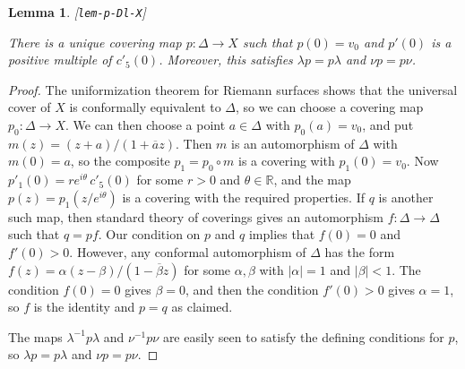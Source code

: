 \documentclass[reqno]{amsart}
\newcommand{\lbl}[1]{\label{#1}\textup{[\texttt{#1}]}\par}
\newcommand{\lbl}{\label}
\newcommand{\Dl}        {\Delta}
\newcommand{\al}        {\alpha}
\newcommand{\bt}        {\beta}
\newcommand{\tht}       {\theta}
\newcommand{\lm}        {\lambda}
\newcommand{\R}         {{\mathbb{R}}}
\newcommand{\ov}[1]     {\overline{#1}}
\renewcommand{\:}{\colon}
\newtheorem{lemma}[theorem]{Lemma}
\theoremstyle{definition}
\begin{document}
\begin{lemma}\lbl{lem-p-Dl-X}
 There is a unique covering map $p\:\Dl\to X$ such that $p(0)=v_0$ and
 $p'(0)$ is a positive multiple of $c'_5(0)$.  Moreover, this
 satisfies $\lm p=p\lm$ and $\nu p=p\nu$.
\end{lemma}
\begin{proof}
 The uniformization theorem for Riemann surfaces shows that the
 universal cover of $X$ is conformally equivalent to $\Dl$, so we can
 choose a covering map $p_0\:\Dl\to X$.  We can then choose a point
 $a\in\Dl$ with $p_0(a)=v_0$, and put $m(z)=(z+a)/(1+\ov{a}z)$.  Then
 $m$ is an automorphism of $\Dl$ with $m(0)=a$, so the composite
 $p_1=p_0\circ m$ is a covering with $p_1(0)=v_0$.  Now
 $p'_1(0)=re^{i\tht}\,c'_5(0)$ for some $r>0$ and $\tht\in\R$, and the
 map $p(z)=p_1(z/e^{i\tht})$ is a covering with the required
 properties.  If $q$ is another such map, then standard theory of
 coverings gives an automorphism $f\:\Dl\to\Dl$ such that $q=pf$.  Our
 condition on $p$ and $q$ implies that $f(0)=0$ and $f'(0)>0$.
 However, any conformal automorphism of $\Dl$ has the form
 $f(z)=\al(z-\bt)/(1-\ov{\bt}z)$ for some $\al,\bt$ with $|\al|=1$ and
 $|\bt|<1$.  The condition $f(0)=0$ gives $\bt=0$, and then the
 condition $f'(0)>0$ gives $\al=1$, so $f$ is the identity and $p=q$
 as claimed.

 The maps $\lm^{-1}p\lm$ and $\nu^{-1}p\nu$ are easily seen to satisfy
 the defining conditions for $p$, so $\lm p=p\lm$ and $\nu p=p\nu$.
\end{proof}
\end{document}
